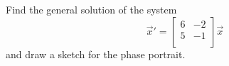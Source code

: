 \begin{exercise}\ansMark%
Find the general solution of the system
\begin{equation*}
{\vec{x}}' = \begin{bmatrix}
6 & -2 \\ 
5 & -1 \\ 
\end{bmatrix} \vec{x}
\end{equation*}
and draw a sketch for the phase portrait.
\end{exercise}
%






\setcounter{exercise}{100}












